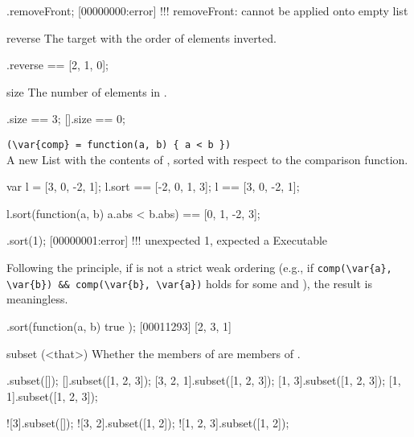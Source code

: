 \begin{urbiscriptapi}
\begin{urbiassert}
[].removeFront;
[00000000:error] !!! removeFront: cannot be applied onto empty list
\end{urbiassert}


\item[reverse]
  The target with the order of elements inverted.
\begin{urbiassert}
[0, 1, 2].reverse == [2, 1, 0];
\end{urbiassert}


\item[size]
  The number of elements in \this.
\begin{urbiassert}
[0, 1, 2].size == 3;
[].size == 0;
\end{urbiassert}


\item {}\lstinline|(\var{comp} = function(a, b) { a < b })|\\%
  A new List with the contents of \this, sorted with respect to the
   comparison function.
\begin{urbiassert}
var l = [3, 0, -2, 1];
l.sort == [-2, 0, 1, 3];
l      == [3, 0, -2, 1];

l.sort(function(a, b) {a.abs < b.abs})
       == [0, 1, -2, 3];
\end{urbiassert}

\begin{urbiscript}
[2, 1].sort(1);
[00000001:error] !!! unexpected 1, expected a Executable
\end{urbiscript}

Following the 
principle, if  is not a strict weak ordering (e.g., if
\lstinline|comp(\var{a}, \var{b}) && comp(\var{b}, \var{a})| holds for some
 and ), the result is meaningless.

\begin{urbiscript}
[1, 2, 3].sort(function(a, b) { true });
[00011293] [2, 3, 1]
\end{urbiscript}


\item[subset](<that>)%
  Whether the members of \this are members of .

\begin{urbiassert}
        [].subset([]);
        [].subset([1, 2, 3]);
 [3, 2, 1].subset([1, 2, 3]);
    [1, 3].subset([1, 2, 3]);
    [1, 1].subset([1, 2, 3]);

      ![3].subset([]);
   ![3, 2].subset([1, 2]);
![1, 2, 3].subset([1, 2]);
\end{urbiassert}



\end{urbiscriptapi}
